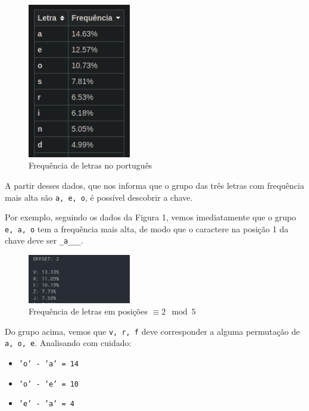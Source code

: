\documentclass{article}
\begin{document}
    \newpage
    \FloatBarrier
    \begin{figure}[!ht]
        \begin{center}
            \includegraphics[width=0.4\textwidth]{images/q4_2.png}
            \caption{Frequência de letras no português}
        \end{center}
    \end{figure} 

    A partir desses dados, que nos informa que o grupo das três letras com frequência mais alta são \texttt{a, e, o}, é possível descobrir a chave.
    
    Por exemplo, seguindo os dados da Figura 1, vemos imediatamente que o grupo \texttt{e, a, o} tem a frequência mais alta, de modo que o caractere na posição 1 da chave deve ser \texttt{\_a\_\_\_}.

    \FloatBarrier
    \begin{figure}[!ht]
        \begin{center}
            \includegraphics[width=0.4\textwidth]{images/q4_3.png}
            \caption{Frequência de letras em posições $\equiv 2 \mod{5}$}
        \end{center}
    \end{figure} 

    Do grupo acima, vemos que \texttt{v, r, f} deve corresponder a alguma permutação de \texttt{a, o, e}. Analisando com cuidado:

    \begin{itemize}
        \item \texttt{'o' - 'a' = 14}
        \item \texttt{'o' - 'e' = 10}
        \item \texttt{'e' - 'a' = 4}
    \end{itemize}
\end{document}
